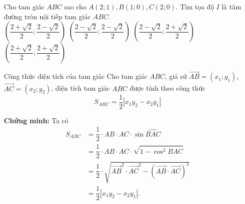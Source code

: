 \begin{vd}%
Cho tam giác $ABC$ sao cho $A(2;1), B(1;0), C(2;0)$. Tìm tọa độ $I$ là tâm đường tròn nội tiếp tam giác $ABC$.\\
\choice
{\True $\left( \dfrac{2+\sqrt{2}}{2};\dfrac{2-\sqrt{2}}{2}\right)$}
{$\left( \dfrac{2-\sqrt{2}}{2};\dfrac{2-\sqrt{2}}{2}\right)$}
{$\left( \dfrac{2-\sqrt{2}}{2};\dfrac{2+\sqrt{2}}{2}\right)$}
{$\left( \dfrac{2+\sqrt{2}}{2};\dfrac{2+\sqrt{2}}{2}\right)$}
\end{vd}

\begin{dang}{Công thức diện tích của tam giác}
Cho tam giác $ABC$, giả sử $\overrightarrow{AB} = (x_1;y_1)$, $\overrightarrow{AC} = (x_2;y_2)$, diện tích tam giác $ABC$ được tính theo công thức $$S_{ABC} = \dfrac{1}{2} \left |x_1y_2-x_2y_1\right |$$
\end{dang}
\noindent \textbf{Chứng minh:}  Ta có 
\begin{align*}
S_{ABC} &= \dfrac{1}{2} \cdot  AB \cdot AC \cdot \sin \widehat{BAC} \\
&= \dfrac{1}{2} \cdot AB \cdot AC \cdot \sqrt{1-\cos^2 \widehat{BAC}} \\
&=\dfrac{1}{2} \cdot \sqrt{\overrightarrow{AB}^2 \cdot \overrightarrow{AC}^2 - \left (\overrightarrow{AB} \cdot \overrightarrow{AC}\right )^2} \\
&=\dfrac{1}{2} \left |x_1y_2-x_2y_1\right |.
\end{align*}

